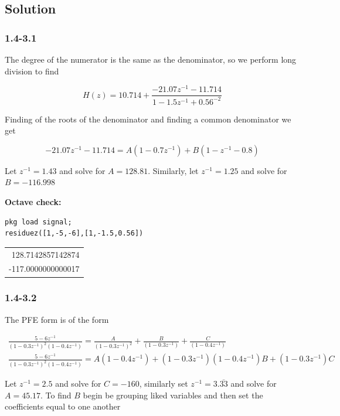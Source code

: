 \documentclass[11pt,a4paper,final]{article}
\begin{document}
\subsection{Solution}
\label{sec:org3decac5}

\subsubsection{1.4-3.1}
\label{sec:orgb4b6077}
The degree of the numerator is the same as the denominator, so we perform long division to find

$$
H(z) = 10.714 + \frac{-21.07z^{-1} - 11.714}{1-1.5z^{-1}+0.56^{-2}}
$$

Finding of the roots of the denominator and finding a common denominator we get

$$
-21.07z^{-1} - 11.714 = A(1- 0.7z^{-1}) + B(1-z^{-1} - 0.8)
$$

Let \(z^{-1} = 1.43\) and solve for \(A = 128.81\). Similarly, let \(z^{-1} = 1.25\) and solve for \(B = -116.998\)

\textbf{\textbf{Octave check:}}

\begin{verbatim}
pkg load signal;
residuez([1,-5,-6],[1,-1.5,0.56])
\end{verbatim}

\begin{center}
\begin{tabular}{r}
128.7142857142874\\
-117.0000000000017\\
\end{tabular}
\end{center}

\subsubsection{1.4-3.2}
\label{sec:org14a059e}
The PFE form is of the form

\begin{equation*}
\begin{array}{c}
\frac{5-6z^{-1}}{(1-0.3z^{-1})^2(1-0.4z^{-1})} = \frac{A}{(1-0.3z^{-1})^2} + \frac{B}{(1-0.3z^{-1})} + \frac{C}{(1-0.4z^{-1})} \\
\frac{5-6z^{-1}}{(1-0.3z^{-1})^2(1-0.4z^{-1})} = A(1-0.4z^{-1}) + (1-0.3z^{-1})(1-0.4z^{-1})B + (1-0.3z^{-1})C
\end{array}
\end{equation*}

Let \(z^{-1} = 2.5\) and solve for \(C = -160\), similarly set \(z^{-1} = 3.\bar{33}\) and solve for \(A = 45.17\). To find \(B\)
begin be grouping liked variables and then set the coefficients equal to one another
\end{document}

